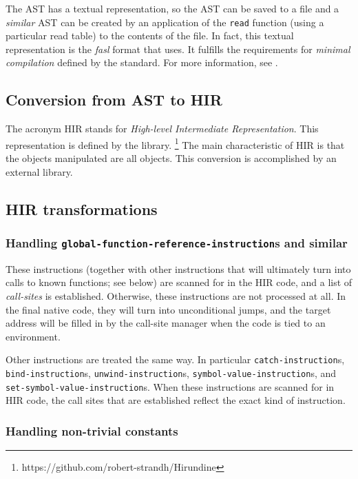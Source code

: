 The AST has a textual representation, so the AST can be saved to a
file and a \emph{similar} AST can be created by an application of the
\texttt{read} function (using a particular read table) to the contents
of the file.  In fact, this textual representation is the \emph{fasl}
format that \sysname{} uses.  It fulfills the requirements for
\emph{minimal compilation} defined by the \commonlisp{} standard.
For more information, see .

\subsection{Conversion from AST to HIR}
\label{sec-conversion-from-ast-to-hir}

The acronym HIR stands for \emph{High-level Intermediate
  Representation}.  This representation is defined by the \hirundine{}
library.%
\footnote{https://github.com/robert-strandh/Hirundine}
The main characteristic of HIR is that the objects manipulated are all
\commonlisp{} objects.  This conversion is accomplished by an external
library.

\subsection{HIR transformations}

\subsubsection{Handling \texttt{global-function-reference-instruction}s and similar}

These instructions (together with other instructions that will
ultimately turn into calls to known functions; see below) are scanned
for in the HIR code, and a list of \emph{call-sites} is established.
Otherwise, these instructions are not processed at all.  In the final
native code, they will turn into unconditional jumps, and the target
address will be filled in by the call-site manager when the code is
tied to an environment.

Other instructions are treated the same way.  In particular
\texttt{catch-instruction}s, \texttt{bind-instruction}s,
\texttt{unwind-instruction}s, \texttt{symbol-value-instruction}s, and
\texttt{set-symbol-value-instruction}s.  When these instructions are
scanned for in HIR code, the call sites that are established reflect
the exact kind of instruction.

\subsubsection{Handling non-trivial constants}

